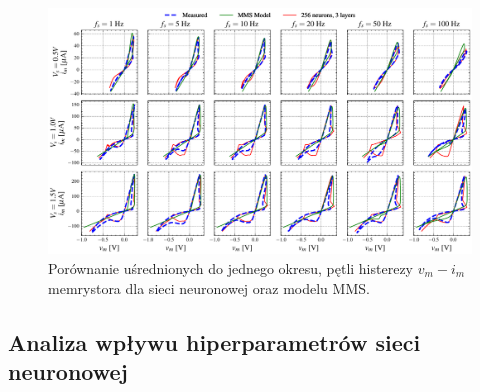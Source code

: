 \documentclass[11pt, oneside]{article}
\begin{document}
\begin{figure}[htbp!]
    \centering
    \includegraphics[width=\linewidth]{mms_results/simulated_histeresis.pdf}
    \caption{Porównanie uśrednionych do jednego okresu, pętli histerezy $v_m - i_m$ memrystora  dla sieci neuronowej oraz modelu MMS.}
    \label{fig:mms_histeresis}
\end{figure}




\subsection{Analiza wpływu hiperparametrów sieci neuronowej}

\clearpage
\printbibliography[heading=bibintoc, title={Bibliografia}]
\end{document}
